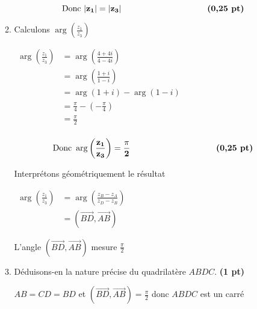 \documentclass[12pt,a4paper]{article}
\begin{document}
\begin{enumerate}
\begin{enumerate}
\begin{resultbox}
    \[
    \mathbf{ \text{ Donc }   |z_1| = |z_3|  \hspace{3.6cm} \textbf{(0,25 pt)}}
    \]
\end{resultbox} 
        
        \item Calculons \( \arg (\frac{z_{1}}{z_{3}}) \)

\( 
\begin{aligned}
  \arg \left(\frac{z_{1}}{z_{3}}\right) & = \arg \left(\frac{4 + 4i}{4-4i}\right)\\
  																			& = \arg \left(\frac{1 + i}{1-i}\right)\\
  																			& = \arg (1 + i) - \arg (1 - i)\\
  																			& = \frac{\pi}{4} - \left( -\frac{\pi}{4} \right)\\
  																			& = \frac{\pi}{2}\\
\end{aligned} 
\)

\begin{resultbox}
    \[
    \mathbf{ \text{ Donc }   \arg \left(\frac{z_{1}}{z_{3}}\right) =  \frac{\pi}{2} \hspace{3.6cm} \textbf{(0,25 pt)}}
    \]
\end{resultbox} 

Interprétons géométriquement le résultat        

\(
\begin{aligned}
\arg \left(\frac{z_{1}}{z_{3}}\right) &= \arg \left(\frac{ z_B-z_A }{ z_D - z_B }\right)\\
																			&=(\overrightarrow{BD},\overrightarrow{AB})
\end{aligned}       
\)  

L'angle \( (\overrightarrow{BD},\overrightarrow{AB}) \) mesure \( \frac{\pi}{2} \)

        \item Déduisons-en la nature précise du quadrilatère \( ABDC \). \hfill \textbf{(1 pt)}

				\( AB=CD=BD \) et \( (\overrightarrow{BD},\overrightarrow{AB}) = \frac{\pi}{2}\) donc \( ABDC \) est un carré
        
    \end{enumerate}
\end{enumerate}
\end{document}
